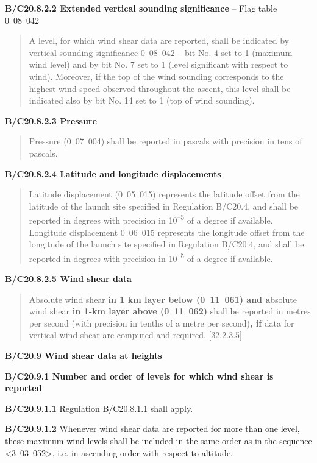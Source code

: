\textbf{B/C20.8.2.2 Extended vertical sounding significance} -- Flag table 0~08~042

\begin{quote}
A level, for which wind shear data are reported, shall be indicated by vertical sounding significance 0~08~042 -- bit No. 4 set to 1 (maximum wind level) and by bit No. 7 set to 1 (level significant with respect to wind). Moreover, if the top of the wind sounding corresponds to the highest wind speed observed throughout the ascent, this level shall be indicated also by bit No. 14 set to 1 (top of wind sounding).
\end{quote}

\textbf{B/C20.8.2.3 Pressure}

\begin{quote}
Pressure (0~07~004) shall be reported in pascals with precision in tens of pascals.
\end{quote}

\textbf{B/C20.8.2.4 Latitude and longitude displacements}

\begin{quote}
Latitude displacement (0~05~015) represents the latitude offset from the latitude of the launch site specified in Regulation B/C20.4, and shall be reported in degrees with precision in 10\textsuperscript{--5} of a degree if available. Longitude displacement 0~06~015 represents the longitude offset from the longitude of the launch site specified in Regulation B/C20.4, and shall be reported in degrees with precision in 10\textsuperscript{--5} of a degree if available.
\end{quote}

\textbf{B/C20.8.2.5 Wind shear data}

\begin{quote}
Absolute wind shear \textbf{in 1 km layer below (0~11~061) and a}bsolute wind shear \textbf{in 1‑km layer above (0~11~062)} shall be reported in metres per second (with precision in tenths of a metre per second)\textbf{, if} data for vertical wind shear are computed and required. {[}32.2.3.5{]}
\end{quote}

\textbf{B/C20.9 Wind shear data at heights}

\textbf{B/C20.9.1 Number and order of levels for which wind shear is reported}

\textbf{B/C20.9.1.1} Regulation B/C20.8.1.1 shall apply.

\textbf{B/C20.9.1.2} Whenever wind shear data are reported for more than one level, these maximum wind levels shall be included in the same order as in the sequence \textless3~03~052\textgreater, i.e. in ascending order with respect to altitude.

